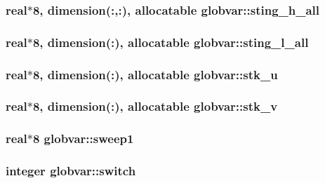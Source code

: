 \subsubsection[{sting\+\_\+h\+\_\+all}]{\setlength{\rightskip}{0pt plus 5cm}real$\ast$8, dimension(\+:,\+:), allocatable globvar\+::sting\+\_\+h\+\_\+all}\label{namespaceglobvar_afab867a5ed560efb35549138a3645ead}
\hypertarget{namespaceglobvar_a598b9f7682973868c54d34e1a05ad030}{}
\subsubsection[{sting\+\_\+l\+\_\+all}]{\setlength{\rightskip}{0pt plus 5cm}real$\ast$8, dimension(\+:), allocatable globvar\+::sting\+\_\+l\+\_\+all}\label{namespaceglobvar_a598b9f7682973868c54d34e1a05ad030}
\hypertarget{namespaceglobvar_afbf780b139c39ff8db75247ee75175f6}{}
\subsubsection[{stk\+\_\+u}]{\setlength{\rightskip}{0pt plus 5cm}real$\ast$8, dimension(\+:), allocatable globvar\+::stk\+\_\+u}\label{namespaceglobvar_afbf780b139c39ff8db75247ee75175f6}
\hypertarget{namespaceglobvar_a9d8a1cb2fc5fe27167d0e136347140cd}{}
\subsubsection[{stk\+\_\+v}]{\setlength{\rightskip}{0pt plus 5cm}real$\ast$8, dimension(\+:), allocatable globvar\+::stk\+\_\+v}\label{namespaceglobvar_a9d8a1cb2fc5fe27167d0e136347140cd}
\hypertarget{namespaceglobvar_a2d93dde71ed9b4b71b5640624a2dba82}{}
\subsubsection[{sweep1}]{\setlength{\rightskip}{0pt plus 5cm}real$\ast$8 globvar\+::sweep1}\label{namespaceglobvar_a2d93dde71ed9b4b71b5640624a2dba82}
\hypertarget{namespaceglobvar_a505145f479910632ea341b88c8333e04}{}
\subsubsection[{switch}]{\setlength{\rightskip}{0pt plus 5cm}integer globvar\+::switch}\label{namespaceglobvar_a505145f479910632ea341b88c8333e04}
\hypertarget{namespaceglobvar_a9eef0dca95de0a13eb716ae8aef154c5}{}
